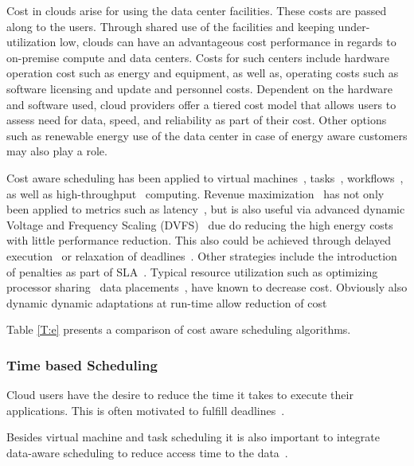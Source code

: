 \documentclass[final,5p,times,twocolumn]{elsarticle}
\begin{document}
Cost in clouds arise for using the data center facilities. These costs
are passed along to the users. Through shared use of the facilities
and keeping under-utilization low, clouds can have an advantageous
cost performance in regards to on-premise compute and data
centers. Costs for such centers include hardware operation cost such
as energy and equipment, as well as, operating costs such as software
licensing and update and personnel costs. Dependent on the hardware
and software used, cloud providers offer a tiered cost model that
allows users to assess need for data, speed, and reliability as part
of their cost.  Other options such as renewable energy use of the data
center in case of energy aware customers may also play a role.

Cost aware scheduling has been applied to virtual
machines~\cite{yuan2017ttsa},
tasks~\cite{yuan2017temporal,zuo2015multi},
workflows~\cite{arabnejad2015cost,arabnejad2016budget}, as well as
high-throughput~\cite{yuan2016cawsac} computing.  Revenue
maximization~\cite{yuan2018warm} has not only been applied to metrics
such as latency~\cite{ghahramani2017toward}, but is also useful via
advanced dynamic Voltage and Frequency Scaling
(DVFS)~\cite{las10cloudsched,calheiros2014energy} due do reducing the
high energy costs with little performance reduction. This also could
be achieved through delayed execution~\cite{bi2016trs} or relaxation
of deadlines~\cite{zhang2018dynamic}.  Other strategies include the
introduction of penalties as part of SLA~\cite{wu2012sla}. Typical
resource utilization such as optimizing processor
sharing~\cite{lee2012profit} data placements~\cite{lee2012profit},
have known to decrease cost. Obviously also dynamic dynamic
adaptations at run-time allow reduction of cost~\cite{ari2013design}

Table \ref{T:e} presents a comparison of cost aware scheduling algorithms.





\subsubsection{Time based Scheduling}\label{sec:time}



Cloud users have the desire to reduce the time it takes to execute
their applications. This is often motivated to fulfill
deadlines~\cite{arabnejad2017scheduling}.

Besides virtual machine and task scheduling it is also important to
integrate data-aware scheduling to reduce access time to the
data~\cite{vandenbosshe2013}.
\end{document}
